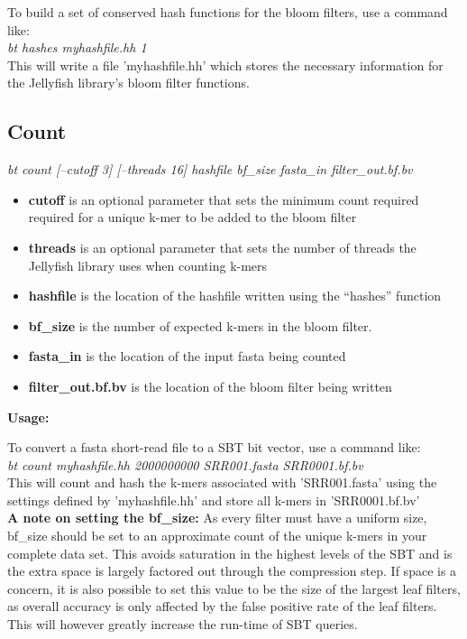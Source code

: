 \documentclass{article}
\begin{document}
To build a set of conserved hash functions for the bloom filters, use a command like: \\

\textit{bt hashes myhashfile.hh 1} \\

This will write a file 'myhashfile.hh' which stores the necessary information for the Jellyfish library's bloom filter functions.

\subsection{Count}
\textit{bt count [--cutoff 3] [--threads 16] hashfile bf\_size fasta\_in filter\_out.bf.bv}
\begin{itemize}
\item \textbf{cutoff} is an optional parameter that sets the minimum count required required for a unique k-mer to be added to the bloom filter
\item \textbf{threads} is an optional parameter that sets the number of threads the Jellyfish library uses when counting k-mers
\item \textbf{hashfile} is the location of the hashfile written using the ``hashes'' function
\item \textbf{bf\_size} is the number of expected k-mers in the bloom filter. 
\item \textbf{fasta\_in} is the location of the input fasta being counted
\item \textbf{filter\_out.bf.bv} is the location of the bloom filter being written
\end{itemize}
\textbf{Usage:}

To convert a fasta short-read file to a SBT bit vector, use a command like: \\

\textit{bt count myhashfile.hh 2000000000 SRR001.fasta SRR0001.bf.bv} \\

This will count and hash the k-mers associated with 'SRR001.fasta' using the settings defined by 'myhashfile.hh' and store all k-mers in 'SRR0001.bf.bv' \\

\textbf{A note on setting the bf\_size:}
As every filter must have a uniform size, bf\_size should be set to an approximate count of the unique k-mers in your complete data set. This avoids saturation in the highest levels of the SBT and is the extra space is largely factored out through the compression step. If space is a concern, it is also possible to set this value to be the size of the largest leaf filters, as overall accuracy is only affected by the false positive rate of the leaf filters. This will however greatly increase the run-time of SBT queries. 
\end{document}
